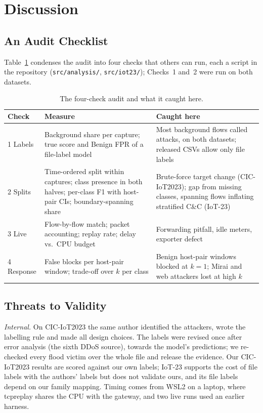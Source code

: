 \section{Discussion}\label{sec:discussion}

\subsection{An Audit Checklist}\label{sec:checklist}

Table~\ref{tab:checklist} condenses the audit into four checks that others can run, each a script in the repository (\nolinkurl{src/analysis/}, \nolinkurl{src/iot23/}); Checks~1 and~2 were run on both datasets.

\begin{table}[t]
\centering
\caption{The four-check audit and what it caught here.}
\label{tab:checklist}
\footnotesize
\setlength{\tabcolsep}{3pt}
\begin{tabular}{p{1.0cm}p{3.5cm}p{3.6cm}}
\hline
Check & Measure & Caught here \\
\hline
1 Labels & Background share per capture; true score and Benign FPR of a file-label model & Most background flows called attacks, on both datasets; released CSVs allow only file labels \\
2 Splits & Time-ordered split within captures; class presence in both halves; per-class F1 with host-pair CIs; boundary-spanning share & Brute-force target change (CIC-IoT2023); gap from missing classes, spanning flows inflating stratified C\&C (IoT-23) \\
3 Live & Flow-by-flow match; packet accounting; replay rate; delay vs.\ CPU budget & Forwarding pitfall, idle meters, exporter defect \\
4 Response & False blocks per host-pair window; trade-off over $k$ per class & Benign host-pair windows blocked at $k=1$; Mirai and web attackers lost at high $k$ \\
\hline
\end{tabular}
\end{table}

\subsection{Threats to Validity}\label{sec:threats}

\emph{Internal.} On CIC-IoT2023 the same author identified the attackers, wrote the labelling rule and made all design choices. The labels were revised once after error analysis (the sixth DDoS source), towards the model's predictions; we re-checked every flood victim over the whole file and release the evidence. Our CIC-IoT2023 results are scored against our own labels; IoT-23 supports the cost of file labels with the authors' labels but does not validate ours, and its file labels depend on our family mapping. Timing comes from WSL2 on a laptop, where tcpreplay shares the CPU with the gateway, and two live runs used an earlier harness.


